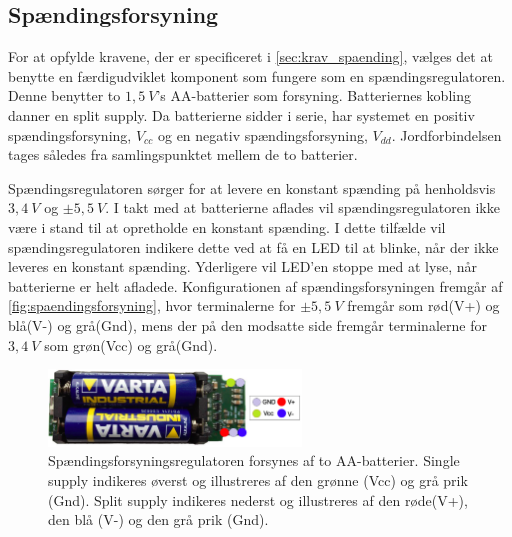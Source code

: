 \subsection{Spændingsforsyning}
For at opfylde kravene, der er specificeret i \autoref{sec:krav_spaending}, vælges det at benytte en færdigudviklet komponent som fungere som en spændingsregulatoren. Denne benytter to $1,5~V$'s AA-batterier som forsyning. Batteriernes kobling danner en split supply. Da batterierne sidder i serie, har systemet en positiv spændingsforsyning, ${V}_{cc}$ og en negativ spændingsforsyning, ${V}_{dd}$. Jordforbindelsen tages således fra samlingspunktet mellem de to batterier.

Spændingsregulatoren sørger for at levere en konstant spænding på henholdsvis $3,4~V$ og $\pm 5,5~V$. I takt med at batterierne aflades vil spændingsregulatoren ikke være i stand til at opretholde en konstant spænding. I dette tilfælde vil spændingsregulatoren indikere dette ved at få en LED til at blinke, når der ikke leveres en konstant spænding. Yderligere vil LED'en stoppe med at lyse, når batterierne er helt afladede. 
Konfigurationen af spændingsforsyningen fremgår af \autoref{fig:spaendingsforsyning}, hvor terminalerne for $\pm 5,5~V$ fremgår som rød(V+) og blå(V-) og grå(Gnd), mens der på den modsatte side fremgår terminalerne for $3,4~V$ som grøn(Vcc) og grå(Gnd). 

\begin{figure}[H]
\centering
\includegraphics[width=0.6\textwidth]{figures/spaendingsforsyning}
\caption{Spændingsforsyningsregulatoren forsynes af to AA-batterier. Single supply indikeres øverst og illustreres af den grønne (Vcc) og grå prik (Gnd). Split supply indikeres nederst og illustreres af den røde(V+), den blå (V-) og den grå prik (Gnd).}
\label{fig:spaendingsforsyning}
\end{figure}

